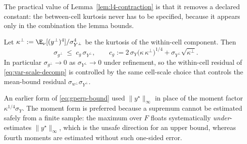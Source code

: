 The practical value of Lemma~\ref{lem:l4-contraction} is that it removes
a declared constant: the between-cell kurtosis never has to be specified,
because it appears only in the combination the lemma bounds.

\begin{lemma}
\label{lem:gperp}
Let $\kappa^{\perp}:=\E_\nu[(y^{\perp})^4]/\sigma_{Y^{\perp}}^4$ be the
kurtosis of the within-cell component. Then
\begin{equation}
  \sigma_{g^{\perp}}\;\le\;c_g\,\sigma_{Y^{\perp}},
  \qquad
  c_g:=2\,\sigma_Y\big(\kappa\,\kappa^{\perp}\big)^{1/4}
       +\sigma_{Y^{\perp}}\sqrt{\kappa^{\perp}} .
  \label{eq:gperp-bound}
\end{equation}
In particular $\sigma_{g^{\perp}}\to0$ as $\sigma_{Y^{\perp}}\to0$ under
refinement, so the within-cell residual of \eqref{eq:var-scale-decomp} is
controlled by the same cell-scale choice that controls the mean-bound
residual $\sigma_{w^{\perp}}\sigma_{Y^{\perp}}$.
\end{lemma}

\begin{remark}
\label{rem:gperp-moments}
An earlier form of \eqref{eq:gperp-bound} used $\|y^{\star}\|_\infty$ in
place of the moment factor $\kappa^{1/4}\sigma_Y$. The moment form is
preferred because a supremum cannot be estimated safely from a finite
sample: the maximum over $F$ floats systematically \emph{under}-estimates
$\|y^{\star}\|_\infty$, which is the unsafe direction for an upper bound,
whereas fourth moments are estimated without such one-sided error.
\end{remark}

